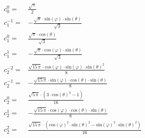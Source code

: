 \documentclass[thesis.tex]{subfiles}
\begin{document}
\begin{align}
c^0_0 =& \frac{\sqrt{\pi }}{2}\\
c^{-1}_1 =& -\frac{\sqrt{\pi }\cdot \mathrm{sin}\left( \varphi\right) \cdot \mathrm{sin}\left( \theta\right) }{\sqrt{3}}\\
c^0_1 =& \frac{\sqrt{\pi }\cdot \mathrm{cos}\left( \theta\right) }{\sqrt{3}}\\
c^1_1 =& -\frac{\sqrt{\pi }\cdot \mathrm{cos}\left( \varphi\right) \cdot \mathrm{sin}\left( \theta\right) }{\sqrt{3}}\\
c^{-2}_2 =& \frac{\sqrt{15 \, \pi}\cdot \mathrm{cos}\left( \varphi\right) \cdot \mathrm{sin}\left( \varphi\right) \cdot {{\mathrm{sin}\left( \theta\right) }^{2}}}{8}\\
c^{-1}_2 =& -\frac{\sqrt{15 \, \pi}\cdot \mathrm{sin}\left( \varphi\right) \cdot \mathrm{cos}\left( \theta\right) \cdot \mathrm{sin}\left( \theta\right) }{8}\\
c^0_2 =& \frac{\sqrt{5 \, \pi}\cdot \left( 3\cdot {{\mathrm{cos}\left( \theta\right) }^{2}}-1\right) }{16}\\
c^1_2 =& -\frac{\sqrt{15 \, \pi}\cdot \mathrm{cos}\left( \varphi\right) \cdot \mathrm{cos}\left( \theta\right) \cdot \mathrm{sin}\left( \theta\right) }{8}\\
c^2_2 =& \frac{\sqrt{15 \, \pi}\cdot \left( {{\mathrm{cos}\left( \varphi\right) }^{2}}\cdot {{\mathrm{sin}\left( \theta\right) }^{2}}-{{\mathrm{sin}\left( \varphi\right) }^{2}}\cdot {{\mathrm{sin}\left( \theta\right) }^{2}}\right) }{16}
\end{align}
\end{document}
